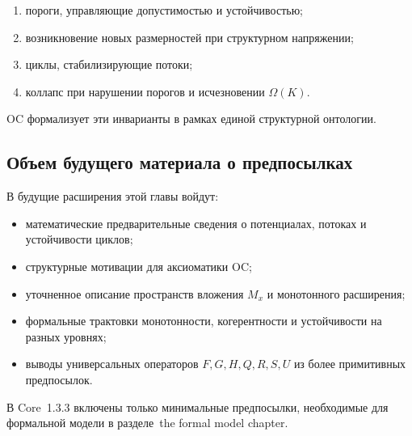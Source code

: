 \begin{enumerate}
    \item пороги, управляющие допустимостью и устойчивостью;
    \item возникновение новых размерностей при структурном напряжении;
    \item циклы, стабилизирующие потоки;
    \item коллапс при нарушении порогов и исчезновении \(\Omega(K)\).
\end{enumerate}

OC формализует эти инварианты в рамках единой структурной онтологии.

\subsection{Объем будущего материала о предпосылках}

В будущие расширения этой главы войдут:

\begin{itemize}
    \item математические предварительные сведения о потенциалах, потоках и устойчивости циклов;
    \item структурные мотивации для аксиоматики OC;
    \item уточненное описание пространств вложения \(M_x\) и монотонного расширения;
    \item формальные трактовки монотонности, когерентности и устойчивости на разных уровнях;
    \item выводы универсальных операторов \(F,G,H,Q,R,S,U\) из более примитивных предпосылок.
\end{itemize}

В Core~1.3.3 включены только минимальные предпосылки, необходимые для формальной модели в разделе~the formal model chapter.
